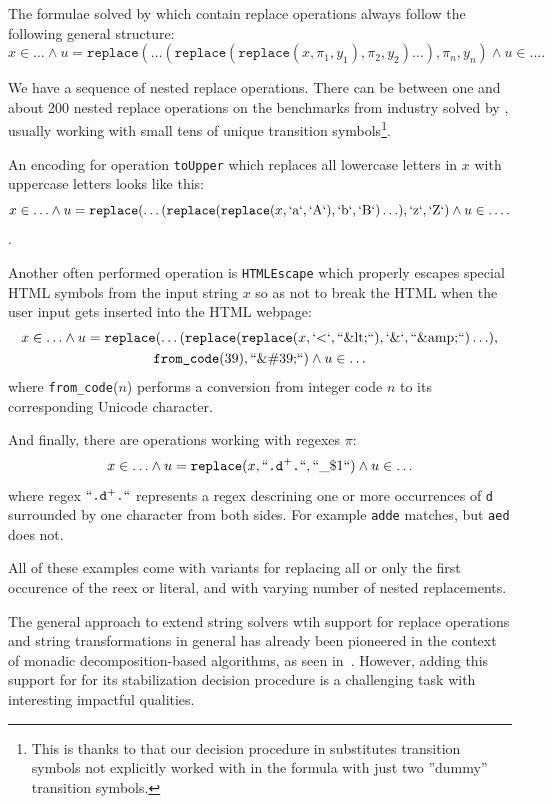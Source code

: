 The formulae solved by \noodler which contain replace operations always follow the following general structure:
$$ x \in \ldots \land u = \texttt{replace}(\ldots (\texttt{replace}(\texttt{replace}(x, \pi_1, y_1), \pi_2, y_2)\ldots), \pi_n, y_n) \land u \in \ldots \text{.}$$

We have a sequence of nested replace operations.
There can be between one and about 200 nested replace operations on the benchmarks from industry solved by \noodler, usually working with small tens of unique transition symbols\footnote{This is thanks to that our decision procedure in \noodler substitutes transition symbols not explicitly worked with in the formula with just two ''dummy'' transition symbols.}.

\begin{example}\label{ex:smt_replace_sequence}
  An encoding for operation \texttt{toUpper} which replaces all lowercase letters in $x$ with uppercase letters looks like this:
  $$ x \in \ldots \land u = \texttt{replace}(\ldots (\texttt{replace}(\texttt{replace}(x, `\text{a}`, `\text{A}`), `\text{b}`, `\text{B}`)\ldots), `\text{z}`, `\text{Z}`)\land u \in \ldots \text{.}$$.

  Another often performed operation is \texttt{HTMLEscape} which properly escapes special HTML symbols from the input string $x$ so as not to break the HTML when the user input gets inserted into the HTML webpage:
  \begin{multline*}
  x \in \ldots \land u = \texttt{replace}(\ldots (\texttt{replace}(\texttt{replace}(x, `\text{<}`, ``\text{\&lt;}``), `\text{\&}`, ``\text{\&amp;}``)\ldots), \\
  \texttt{from\_code}(39), ``\text{\&\#39;}``)\land u \in \ldots
  \end{multline*}
  where \texttt{from\_code}($n$) performs a conversion from integer code $n$ to its corresponding Unicode character.

  And finally, there are operations working with regexes $\pi$:
  $$
    x \in \ldots \land u = \texttt{replace}(x, ``\texttt{.d}^+\texttt{.}``, ``\text{\_\$1}``)\land u \in \ldots
  $$
where regex $``\texttt{.d}^+\texttt{.}``$ represents a regex descrining one or more occurrences of \texttt{d} surrounded by one character from both sides. For example \texttt{adde} matches, but \texttt{aed} does not.

All of these examples come with variants for replacing all or only the first occurence of the reex or literal, and with varying number of nested replacements.

The general approach to extend string solvers wtih support for replace operations and string transformations in general has already been pioneered in the context of monadic decomposition-based algorithms, as seen in~\cite{AnthonyReplaceAll2018, Flatten, ChainFree, StringAFA}.
However, adding this support for \noodler for its stabilization decision procedure is a challenging task with interesting impactful qualities.

\end{example}

